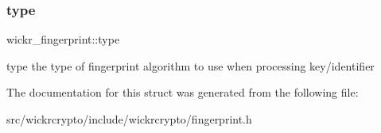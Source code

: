 \subsubsection{\texorpdfstring{type}{type}}
{\footnotesize\ttfamily wickr\+\_\+fingerprint\+::type}

type the type of fingerprint algorithm to use when processing key/identifier 

The documentation for this struct was generated from the following file\+:\begin{DoxyCompactItemize}
\item 
src/wickrcrypto/include/wickrcrypto/fingerprint.\+h\end{DoxyCompactItemize}
